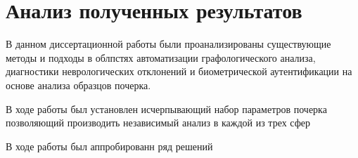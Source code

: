 \section{Анализ полученных результатов}
\label{sec:summary}

В данном диссертационной работы были проанализированы существующие методы и подходы в облпстях автоматизации графологического анализа, диагностики неврологических отклонений и биометрической аутентификации на основе анализа образцов почерка.

В ходе работы был установлен исчерпывающий набор параметров почерка позволяющий производить независимый анализ в каждой из трех сфер

В ходе работы был аппробированн ряд решений 
